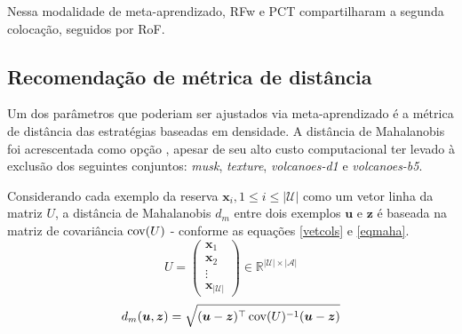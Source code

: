 Nessa modalidade de meta-aprendizado, RFw e PCT compartilharam a segunda colocação, seguidos por RoF.

\subsection{Recomendação de métrica de distância}\label{recdist}

Um dos parâmetros que poderiam ser ajustados via meta-aprendizado é a métrica de distância das estratégias baseadas em densidade.
A distância de Mahalanobis foi acrescentada como opção \cite{mahalanobis1936generalized}, apesar de seu alto custo computacional ter levado à 
exclusão dos seguintes conjuntos:
\textit{musk}, \textit{texture}, \textit{volcanoes-d1} e \textit{volcanoes-b5}.

Considerando cada exemplo da reserva $\bm{x}_i, 1 \leq i\leq |\mathcal{U}|$ como um vetor linha da matriz $U$, a distância de Mahalanobis $d_m$
entre dois exemplos $\bm{u}$ e $\bm{z}$ é baseada na matriz de covariância $\operatorname*{cov}(U)$ - conforme as equações \ref{vetcols} e \ref{eqmaha}.
\begin{equation}\label{vetcols}
   U=\begin{pmatrix}
	\bm{x}_1 \\
	\bm{x}_2 \\
	\vdots \\
	\bm{x}_{|\mathcal{U}|}
	\end{pmatrix}
   \in \mathbb{R}^{|\mathcal{U}|\times|\mathcal{A}|}
\end{equation}
\begin{equation}\label{eqmaha}
	d_m(\bm{u},\bm{z})=\sqrt{(\bm{u} - \bm{z})^{\top} \operatorname*{cov}(U)^{-1} (\bm{u} - \bm{z})}
\end{equation}

